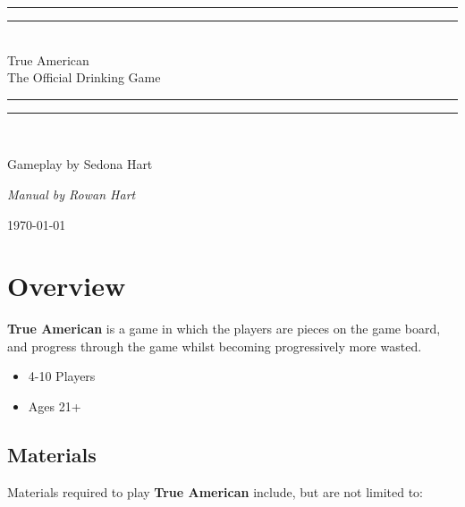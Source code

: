 \documentclass[12pt]{article}
\newlength{\drop}
\begin{document}
\begin{titlepage}
    \textheight
    \centering
    \vspace*{\baselineskip}
    \rule{\textwidth}{1.6pt}\vspace*{-\baselineskip}\vspace*{2pt}
    \rule{\textwidth}{0.4pt}\\[\baselineskip]
    {\LARGE True American \\[0.3\baselineskip] The Official Drinking Game}\\[0.2\baselineskip]
    \rule{\textwidth}{0.4pt}\vspace*{-\baselineskip}\vspace{3.2pt}
    \rule{\textwidth}{1.6pt}\\[\baselineskip]
    \scshape
    \vspace*{2\baselineskip}
    {\Large Gameplay by Sedona Hart\par}
    {\itshape Manual by Rowan Hart\par}
    \vspace*{2\baselineskip}
    {\scshape \today} \\
    \vfill
\end{titlepage}

\section{Overview} \label{overview}

\textbf{True American} is a game in which the players are pieces on the game board, and progress through the game whilst becoming progressively more wasted. \\

\begin{itemize}
\item 4-10 Players
\item Ages 21+
\end{itemize}

\subsection{Materials}

Materials required to play \textbf{True American} include, but are not limited to: \\
\end{document}
